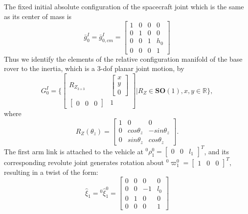 \documentclass[lettersize,journal]{IEEEtran}
\theoremstyle{remark}
\begin{document}
The fixed initial absolute configuration of the spacecraft joint which is the same as its center of mass is
\begin{equation*}
    \bar{g}^I_0=\bar{g}^I_{0,cm}=\begin{bmatrix}1 &0 &0&0 \\0 &1 &0& 0\\0 & 0& 1&h_0 \\0 & 0 & 0 & 1
    \end{bmatrix}
\end{equation*}
Thus we identify the elements of the relative configuration manifold of the base rover to the inertia, which is a 3-dof planar joint motion, by
\begin{equation}
    G^I_0=\Bigg\{\begin{bmatrix}
    R_{Z_{3 \times 3}} & \begin{bmatrix}
    x \\ y \\ 0
    \end{bmatrix}\\ \begin{bmatrix}
    0 & 0 & 0
    \end{bmatrix} & 1
    \end{bmatrix}\Bigg| R_Z \in \textbf{SO}(1),x,y\in\mathbb{R} \Bigg\},
\end{equation}
where
\begin{equation}
    R_Z(\theta_z)=\begin{bmatrix}
    1 & 0 & 0\\0 &cos\theta_z & -sin\theta_z\\0 & sin\theta_z & cos\theta_z
    \end{bmatrix}.
\end{equation}
The first arm link is attached to the vehicle at $^0\rho^0_1=\begin{bmatrix}0 & 0 &l_1\end{bmatrix}^T$, and its corresponding revolute joint generates rotation about $^0\varpi^0_1=\begin{bmatrix} 1 & 0 & 0\end{bmatrix}^T$, resulting in a twist of the form:
\begin{equation*}
    \hat{\xi}_1={}^0\hat{\xi}^0_1=\begin{bmatrix}0 &0 &0&0 \\0 &0 &-1& l_0\\0 & 1& 0&0 \\0 & 0 & 0 & 1
    \end{bmatrix}
\end{equation*}
\end{document}
